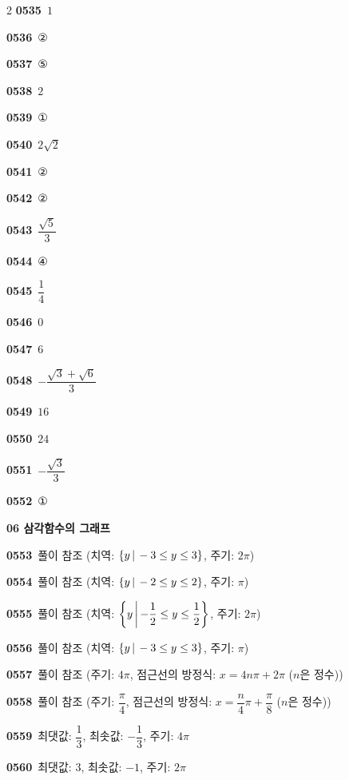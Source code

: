 \documentclass[10pt,a4paper]{article}
\begin{document}
\begin{multicols}{2}
\noindent\textbf{0535}\ $1$\par
\noindent\textbf{0536}\ ②\par
\noindent\textbf{0537}\ ⑤\par
\noindent\textbf{0538}\ $2$\par
\noindent\textbf{0539}\ ①\par
\noindent\textbf{0540}\ $2\sqrt{2}$\par
\noindent\textbf{0541}\ ②\par
\noindent\textbf{0542}\ ②\par
\noindent\textbf{0543}\ $\dfrac{\sqrt{5}}{3}$\par
\noindent\textbf{0544}\ ④\par
\noindent\textbf{0545}\ $\dfrac{1}{4}$\par
\noindent\textbf{0546}\ $0$\par
\noindent\textbf{0547}\ $6$\par
\noindent\textbf{0548}\ $-\dfrac{\sqrt{3}+\sqrt{6}}{3}$\par
\noindent\textbf{0549}\ $16$\par
\noindent\textbf{0550}\ $24$\par
\noindent\textbf{0551}\ $-\dfrac{\sqrt{3}}{3}$\par
\noindent\textbf{0552}\ ①\par
\noindent\textbf{06 삼각함수의 그래프}\par\smallskip
\noindent\textbf{0553}\ 풀이 참조 (치역: $\{y\mkern3mu |\mkern3mu -3\le y\le 3\}$, 주기: $2\pi$)\par
\noindent\textbf{0554}\ 풀이 참조 (치역: $\{y\mkern3mu |\mkern3mu -2\le y\le 2\}$, 주기: $\pi$)\par
\noindent\textbf{0555}\ 풀이 참조 (치역: $\left\{y\mkern3mu \middle|\mkern3mu -\dfrac{1}{2}\le y\le\dfrac{1}{2}\right\}$, 주기: $2\pi$)\par
\noindent\textbf{0556}\ 풀이 참조 (치역: $\{y\mkern3mu |\mkern3mu -3\le y\le 3\}$, 주기: $\pi$)\par
\noindent\textbf{0557}\ 풀이 참조 (주기: $4\pi$, 점근선의 방정식: $x=4n\pi+2\pi$ ($n$은 정수))\par
\noindent\textbf{0558}\ 풀이 참조 (주기: $\dfrac{\pi}{4}$, 점근선의 방정식: $x=\dfrac{n}{4}\pi+\dfrac{\pi}{8}$ ($n$은 정수))\par
\noindent\textbf{0559}\ 최댓값: $\dfrac{1}{3}$, 최솟값: $-\dfrac{1}{3}$, 주기: $4\pi$\par
\noindent\textbf{0560}\ 최댓값: $3$, 최솟값: $-1$, 주기: $2\pi$\par

\end{multicols}
\end{document}
